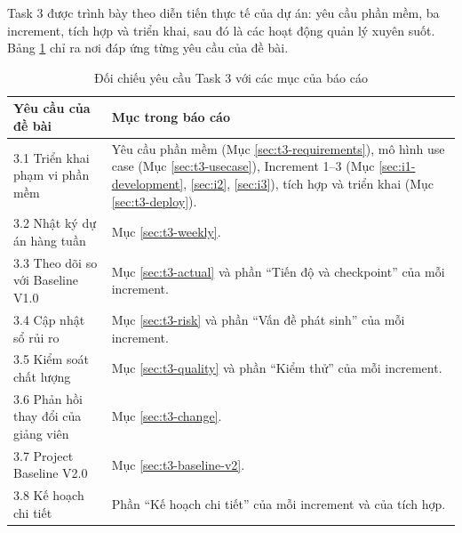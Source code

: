 Task 3 được trình bày theo diễn tiến thực tế của dự án: yêu cầu phần mềm, ba increment, tích hợp và triển khai, sau đó là các hoạt động quản lý xuyên suốt. Bảng \ref{tab:t3-map} chỉ ra nơi đáp ứng từng yêu cầu của đề bài.

\begin{table}[H]
\centering\small
\caption{Đối chiếu yêu cầu Task 3 với các mục của báo cáo}\label{tab:t3-map}
\begin{tabularx}{\linewidth}{@{}p{.30\linewidth}X@{}}
\toprule
\textbf{Yêu cầu của đề bài} & \textbf{Mục trong báo cáo}\\\midrule
3.1 Triển khai phạm vi phần mềm & Yêu cầu phần mềm (Mục \ref{sec:t3-requirements}), mô hình use case (Mục \ref{sec:t3-usecase}), Increment 1--3 (Mục \ref{sec:i1-development}, \ref{sec:i2}, \ref{sec:i3}), tích hợp và triển khai (Mục \ref{sec:t3-deploy}).\\
3.2 Nhật ký dự án hàng tuần & Mục \ref{sec:t3-weekly}.\\
3.3 Theo dõi so với Baseline V1.0 & Mục \ref{sec:t3-actual} và phần ``Tiến độ và checkpoint'' của mỗi increment.\\
3.4 Cập nhật sổ rủi ro & Mục \ref{sec:t3-risk} và phần ``Vấn đề phát sinh'' của mỗi increment.\\
3.5 Kiểm soát chất lượng & Mục \ref{sec:t3-quality} và phần ``Kiểm thử'' của mỗi increment.\\
3.6 Phản hồi thay đổi của giảng viên & Mục \ref{sec:t3-change}.\\
3.7 Project Baseline V2.0 & Mục \ref{sec:t3-baseline-v2}.\\
3.8 Kế hoạch chi tiết & Phần ``Kế hoạch chi tiết'' của mỗi increment và của tích hợp.\\
\bottomrule
\end{tabularx}
\end{table}

